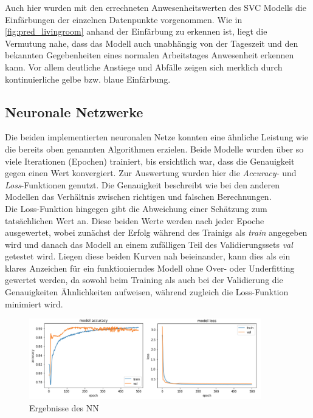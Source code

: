 Auch hier wurden mit den errechneten Anwesenheitswerten des SVC Modells die Einfärbungen der einzelnen Datenpunkte 
vorgenommen. 
Wie in \ref{fig:pred_livingroom} anhand der Einfärbung zu erkennen ist, liegt die Vermutung nahe, dass das Modell 
auch unabhängig von der Tageszeit und den bekannten Gegebenheiten eines normalen Arbeitstages Anwesenheit 
erkennen kann. Vor allem deutliche Anstiege und Abfälle zeigen sich merklich durch kontinuierliche gelbe bzw. 
blaue Einfärbung.
\newpage

\subsection{Neuronale Netzwerke}
Die beiden implementierten neuronalen Netze konnten eine ähnliche Leistung wie die bereits oben genannten 
Algorithmen erzielen. Beide Modelle wurden über so viele Iterationen (Epochen) trainiert, bis ersichtlich war,
dass die Genauigkeit gegen einen Wert konvergiert. Zur Auswertung wurden hier die \textit{Accuracy-} und 
\textit{Loss}-Funktionen genutzt. Die Genauigkeit beschreibt wie bei den anderen Modellen das Verhältnis
zwischen richtigen und falschen Berechnungen.\\
Die Loss-Funktion hingegen gibt die Abweichung einer Schätzung zum tatsächlichen Wert an. Diese beiden Werte 
werden nach jeder Epoche ausgewertet, wobei zunächst der Erfolg während des Trainigs als \textit{train}
angegeben wird und danach das Modell an einem zufälligen Teil des Validierungssets \textit{val} getestet wird.
Liegen diese beiden Kurven nah beieinander, kann dies als ein klares Anzeichen für ein funktionierndes Modell ohne 
Over- oder Underfitting gewertet werden, da sowohl beim Training als auch bei der Validierung die Genauigkeiten 
Ähnlichkeiten aufweisen, während zugleich die Loss-Funktion minimiert wird.

\begin{figure}[h]
    \centering
    \includegraphics[width=0.9\textwidth]{pic/eval_NN.png}
    \caption{Ergebnisse des NN}
    \label{fig:eval_NN}
\end{figure}

